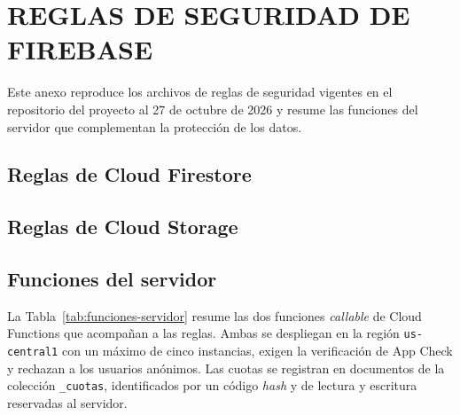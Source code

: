 \chapter{REGLAS DE SEGURIDAD DE FIREBASE}
\label{anx:reglas}

Este anexo reproduce los archivos de reglas de seguridad vigentes en el
repositorio del proyecto al 27 de octubre de 2026 y resume las funciones del
servidor que complementan la protección de los datos.

\section{Reglas de Cloud Firestore}

{\renewcommand{\baselinestretch}{0.95}}

\section{Reglas de Cloud Storage}



\section{Funciones del servidor}

La Tabla~\ref{tab:funciones-servidor} resume las dos funciones \emph{callable}
de Cloud Functions que acompañan a las reglas. Ambas se despliegan en la región
\texttt{us-central1} con un máximo de cinco instancias, exigen la verificación
de App Check y rechazan a los usuarios anónimos. Las cuotas se registran en
documentos de la colección \texttt{\_cuotas}, identificados por un código
\emph{hash} y de lectura y escritura reservadas al servidor.

